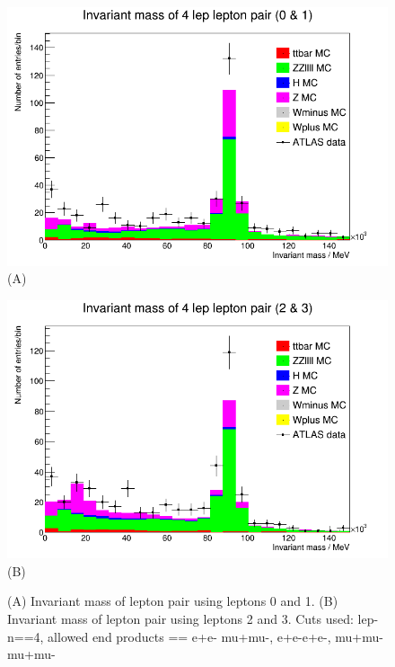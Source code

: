 \begin{figure}[h!]
    \centering
    \begin{minipage}{0.5\textwidth}
        \centering
        \includegraphics[width=\linewidth]{plots/02-03-2021/17-30_0-1.png}
        (A)
    \end{minipage}\hfill
    \begin{minipage}{0.5\textwidth}
        \centering
        \includegraphics[width=\linewidth]{plots/02-03-2021/17-30_2-3.png}
        (B)
    \end{minipage}
    \caption{(A) Invariant mass of lepton pair using leptons 0 and 1. (B) Invariant mass of lepton pair using leptons 2 and 3.  Cuts used: lep-n==4,  allowed end products == e+e- mu+mu-, e+e-e+e-, mu+mu- mu+mu-}
    \label{fig:17-30_02-03-21}
\end{figure}

